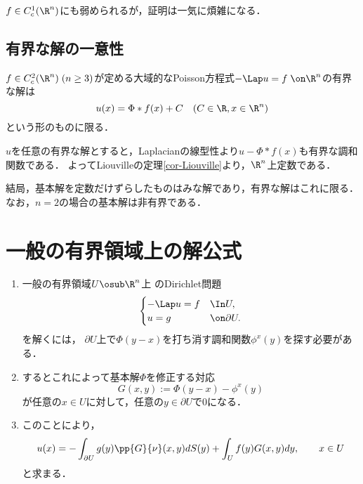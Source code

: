 \documentclass[uplatex,dvipdfmx]{jsreport}
\begin{document}
\begin{remark}
    $f\in C^1_c(\R^n)$にも弱められるが，証明は一気に煩雑になる\cite{Gilbarg}．
\end{remark}

\subsection{有界な解の一意性}

\begin{corollary}
    $f\in C_c^2(\R^n)\;(n\ge3)$が定める大域的なPoisson方程式$-\Lap u=f\;\on\R^n$の有界な解は
    \[u(x)=\Phi*f(x)+C\quad(C\in\R,x\in\R^n)\]
    という形のものに限る．
\end{corollary}
\begin{Proof}
    $u$を任意の有界な解とすると，Laplacianの線型性より$u-\Phi*f(x)$も有界な調和関数である．
    よってLiouvilleの定理\ref{cor-Liouville}より，$\R^n$上定数である．
\end{Proof}

\begin{remarks}
    結局，基本解を定数だけずらしたものはみな解であり，有界な解はこれに限る．
    なお，$n=2$の場合の基本解は非有界である．
\end{remarks}

\section{一般の有界領域上の解公式}

\begin{tcolorbox}[colframe=ForestGreen, colback=ForestGreen!10!white,breakable,colbacktitle=ForestGreen!40!white,coltitle=black,fonttitle=\bfseries\sffamily,
title=一般領域上での解の求め方]
    \begin{enumerate}
        \item 一般の有界領域$U\osub\R^n$上
        のDirichlet問題
        \[\begin{cases}
            -\Lap u=f&\In U,\\
            u=g&\on\partial U.
        \end{cases}\]
        を解くには，
        $\partial U$上で$\Phi(y-x)$を打ち消す調和関数$\phi^x(y)$を探す必要がある．
        \item するとこれによって基本解$\Phi$を修正する対応
        \[G(x,y):=\Phi(y-x)-\phi^x(y)\]
        が任意の$x\in U$に対して，任意の$y\in\partial U$で$0$になる．
        \item このことにより，
        \[u(x)=-\int_{\partial U}g(y)\pp{G}{\nu}(x,y)dS(y)+\int_Uf(y)G(x,y)dy,\qquad x\in U\]
        と求まる．
    \end{enumerate}
\end{tcolorbox}
\end{document}
